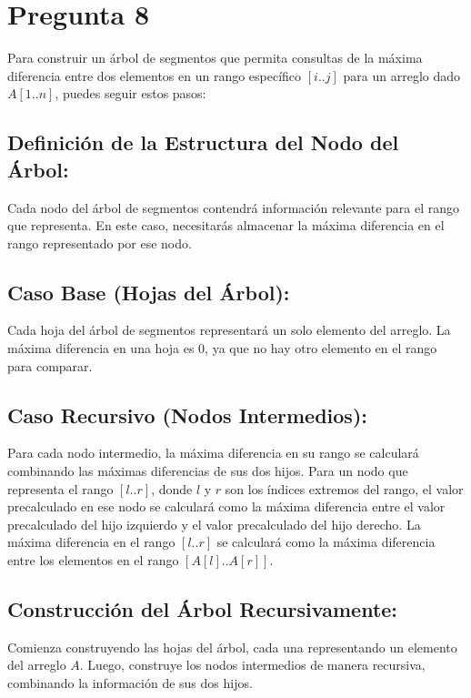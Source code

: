 \documentclass{article}
\begin{document}
\section*{Pregunta 8}

Para construir un árbol de segmentos que permita consultas de la máxima diferencia entre dos elementos en un rango específico \([i..j]\) para un arreglo dado \(A[1..n]\), puedes seguir estos pasos:

\subsection*{Definición de la Estructura del Nodo del Árbol:}

Cada nodo del árbol de segmentos contendrá información relevante para el rango que representa. En este caso, necesitarás almacenar la máxima diferencia en el rango representado por ese nodo.

\subsection*{Caso Base (Hojas del Árbol):}

Cada hoja del árbol de segmentos representará un solo elemento del arreglo. La máxima diferencia en una hoja es 0, ya que no hay otro elemento en el rango para comparar.

\subsection*{Caso Recursivo (Nodos Intermedios):}

Para cada nodo intermedio, la máxima diferencia en su rango se calculará combinando las máximas diferencias de sus dos hijos. Para un nodo que representa el rango \([l..r]\), donde \(l\) y \(r\) son los índices extremos del rango, el valor precalculado en ese nodo se calculará como la máxima diferencia entre el valor precalculado del hijo izquierdo y el valor precalculado del hijo derecho. La máxima diferencia en el rango \([l..r]\) se calculará como la máxima diferencia entre los elementos en el rango \([A[l]..A[r]]\).

\subsection*{Construcción del Árbol Recursivamente:}

Comienza construyendo las hojas del árbol, cada una representando un elemento del arreglo \(A\). Luego, construye los nodos intermedios de manera recursiva, combinando la información de sus dos hijos.
\end{document}
